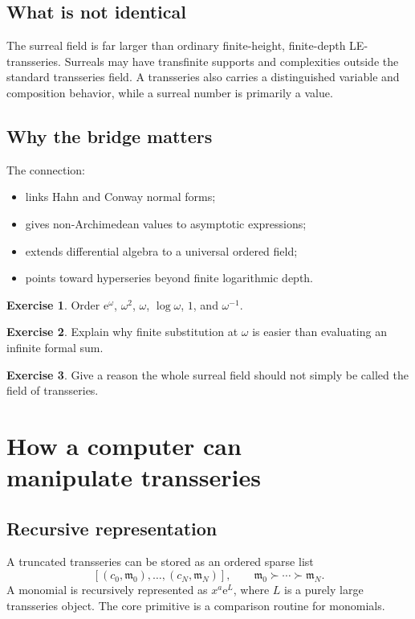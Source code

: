 \documentclass[11pt,oneside,openany]{book}
\newcommand{\e}{\mathrm{e}}
\newcommand{\mon}{\mathfrak{m}}
\theoremstyle{plain}
\theoremstyle{definition}
\newtheorem{exercise}{Exercise}[chapter]
\theoremstyle{remark}
\begin{document}
\section{What is not identical}
The surreal field is far larger than ordinary finite-height, finite-depth LE-transseries. Surreals may have transfinite supports and complexities outside the standard transseries field. A transseries also carries a distinguished variable and composition behavior, while a surreal number is primarily a value.

\section{Why the bridge matters}
The connection:
\begin{itemize}
  \item links Hahn and Conway normal forms;
  \item gives non-Archimedean values to asymptotic expressions;
  \item extends differential algebra to a universal ordered field;
  \item points toward hyperseries beyond finite logarithmic depth.
\end{itemize}

\begin{exercise}
Order $\e^\omega$, $\omega^2$, $\omega$, $\log\omega$, $1$, and $\omega^{-1}$.
\end{exercise}

\begin{exercise}
Explain why finite substitution at $\omega$ is easier than evaluating an infinite formal sum.
\end{exercise}

\begin{exercise}
Give a reason the whole surreal field should not simply be called the field of transseries.
\end{exercise}


\chapter[How a computer can manipulate transseries]{How a computer can\\manipulate transseries}
\label{ch:computation}

\section{Recursive representation}
A truncated transseries can be stored as an ordered sparse list
\[
  [(c_0,\mon_0),\ldots,(c_N,\mon_N)],
  \qquad\mon_0\succ\cdots\succ\mon_N.
\]
A monomial is recursively represented as $x^a\e^L$, where $L$ is a purely large transseries object. The core primitive is a comparison routine for monomials.
\end{document}
